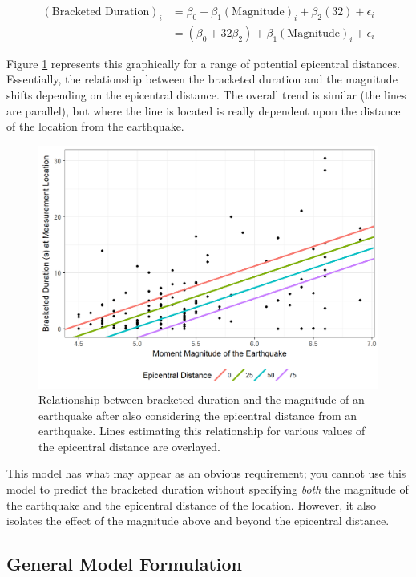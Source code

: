 \documentclass[]{book}
\theoremstyle{plain}
\theoremstyle{mydefn}
\theoremstyle{myexmpl}
\theoremstyle{remark}
\begin{document}
\[
\begin{aligned}
(\text{Bracketed Duration})_i &= \beta_0 + \beta_1(\text{Magnitude})_i + \beta_2(32) + \epsilon_i \\
  &= \left(\beta_0 + 32\beta_2\right) + \beta_1(\text{Magnitude})_i + \epsilon_i
\end{aligned}
\]

Figure \ref{fig:regextensions-mlr-plot} represents this graphically for
a range of potential epicentral distances. Essentially, the relationship
between the bracketed duration and the magnitude shifts depending on the
epicentral distance. The overall trend is similar (the lines are
parallel), but where the line is located is really dependent upon the
distance of the location from the earthquake.

\begin{figure}

{\centering \includegraphics[width=0.8\linewidth]{./Images/regextensions-mlr-plot-1} 

}

\caption{Relationship between bracketed duration and the magnitude of an earthquake after also considering the epicentral distance from an earthquake. Lines estimating this relationship for various values of the epicentral distance are overlayed.}\label{fig:regextensions-mlr-plot}
\end{figure}

This model has what may appear as an obvious requirement; you cannot use
this model to predict the bracketed duration without specifying
\emph{both} the magnitude of the earthquake and the epicentral distance
of the location. However, it also isolates the effect of the magnitude
above and beyond the epicentral distance.

\subsection{General Model Formulation}\label{general-model-formulation}
\end{document}
